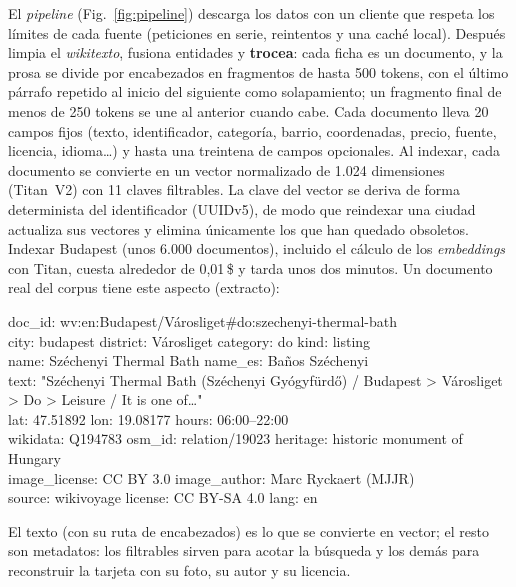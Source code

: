 El \emph{pipeline} (Fig.~\ref{fig:pipeline}) descarga los datos con un cliente que respeta los
límites de cada fuente (peticiones en serie, reintentos y una caché local). Después limpia el \emph{wikitexto}, fusiona entidades y
\textbf{trocea}: cada ficha es un documento, y la prosa se divide por encabezados en fragmentos de
hasta 500 tokens, con el último párrafo repetido al inicio del siguiente como solapamiento; un
fragmento final de menos de 250 tokens se une al anterior cuando cabe. Cada documento lleva 20 campos fijos (texto, identificador, categoría, barrio, coordenadas,
precio, fuente, licencia, idioma\ldots) y hasta una treintena de campos opcionales. Al indexar,
cada documento se convierte en un vector normalizado de 1.024 dimensiones (Titan~V2) con 11 claves
filtrables. La clave del vector se deriva de forma determinista del identificador (UUIDv5), de modo que reindexar una
ciudad actualiza sus vectores y elimina únicamente los que han quedado obsoletos. Indexar Budapest
(unos 6.000 documentos), incluido el cálculo de los \emph{embeddings} con Titan, cuesta alrededor
de 0,01\,\$ y tarda unos dos minutos. Un documento real del corpus tiene este aspecto (extracto):

\noindent\colorbox{klight}{\parbox{\dimexpr\columnwidth-2\fboxsep}{\ttfamily\scriptsize
doc\_id: wv:en:Budapest/Városliget\#do:szechenyi-thermal-bath\\
city: budapest \quad district: Városliget \quad category: do \quad kind: listing\\
name: Széchenyi Thermal Bath \quad name\_es: Baños Széchenyi\\
text: "Széchenyi Thermal Bath (Széchenyi Gyógyfürdő) / Budapest > Városliget > Do > Leisure / It is one of\ldots"\\
lat: 47.51892 \quad lon: 19.08177 \quad hours: 06:00--22:00\\
wikidata: Q194783 \quad osm\_id: relation/19023 \quad heritage: historic monument of Hungary\\
image\_license: CC BY 3.0 \quad image\_author: Marc Ryckaert (MJJR)\\
source: wikivoyage \quad license: CC BY-SA 4.0 \quad lang: en}}

\noindent El texto (con su ruta de encabezados) es lo que se convierte en vector; el resto son
metadatos: los filtrables sirven para acotar la búsqueda y los demás para reconstruir la tarjeta
con su foto, su autor y su licencia.

